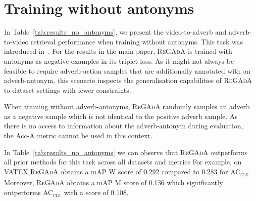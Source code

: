 \documentclass[table]{bmvc2k}
\newcommand{\modelName}{\textsc{ReGAdA}\xspace}
\newcommand{\accls}{AC\textsubscript{\textsc{cls}}}
\begin{document}
\section{Training without antonyms}
In Table~\ref{tab:results_no_antonyms}, we present the video-to-adverb and adverb-to-video retrieval performance when training without antonyms. This task was introduced in~\cite{moltisanti2023learning}. 
For the results in the main paper, \modelName is trained with antonyms as negative examples in its triplet loss. 
As it might not always be feasible to require adverb-action samples that are additionally annotated with an adverb-antonym, this scenario inspects the generalisation capabilities of \modelName to dataset settings with fewer constraints.

When training without adverb-antonyms, \modelName  randomly samples an adverb as a negative sample which is not identical to the positive adverb sample. 
As there is no access to information about the adverb-antonym during evaluation, the Acc-A metric cannot be used in this context.

In Table~\ref{tab:results_no_antonyms} we can observe that \modelName outperforms all prior methods for this task across all datasets and metrics
For example, on VATEX \modelName obtains a mAP W score of 0.292 compared to 0.283 for \accls. Moreover, \modelName obtains a mAP M score of 0.136 which significantly outperforms \accls\ with a score of 0.108. 
\end{document}
